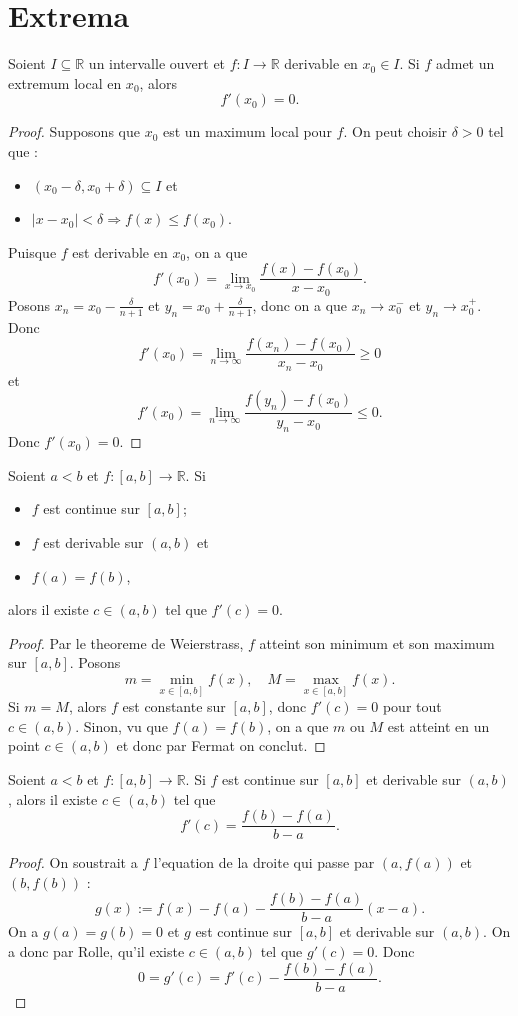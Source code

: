 \section{Extrema}
\begin{theorem}[Fermat]
Soient $I\subseteq \mathbb{R}$ un intervalle ouvert et $f:I\to \mathbb{R}$ derivable en $x_{0}\in I$. Si $f$ admet un extremum local en $x_{0}$, alors
$$
f'(x_{0})=0.
$$
\end{theorem}
\begin{proof}
Supposons que $x_{0}$ est un maximum local pour $f$. On peut choisir $\delta>0$ tel que :
\begin{itemize}
\item $(x_{0}-\delta,x_{0}+\delta)\subseteq I$ et
\item $|x-x_{0}|<\delta \Rightarrow f(x)\le f(x_{0})$.
\end{itemize}
Puisque $f$ est derivable en $x_{0}$, on a que
$$
f'(x_{0})=\lim_{ x \to x_{0} } \frac{f(x)-f(x_{0})}{x-x_{0}}.
$$
Posons $x_{n}=x_{0}-\frac{\delta}{n+1}$ et $y_{n}=x_{0}+\frac{\delta}{n+1}$, donc on a que $x_{n}\to x_{0}^{-}$ et $y_{n}\to x_{0}^{+}$. Donc
$$
f'(x_{0})=\lim_{ n\to \infty}  \frac{f(x_{n})-f(x_{0})}{x_{n}-x_{0}} \ge0
$$
et
$$
f'(x_{0})=\lim_{ n \to \infty } \frac{f(y_{n})-f(x_{0})}{y_{n}-x_{0}} \le 0.
$$
Donc $f'(x_{0})=0$.
\end{proof}
\begin{theorem}[Rolle]
Soient $a<b$ et $f:[a,b]\to \mathbb{R}$. Si
\begin{itemize}
\item $f$ est continue sur $[a,b]$;
\item $f$ est derivable sur $(a,b)$ et
\item $f(a)=f(b)$,
\end{itemize}
alors il existe $c\in(a,b)$ tel que $f'(c)=0$.
\end{theorem}
\begin{proof}
Par le theoreme de Weierstrass, $f$ atteint son minimum et son maximum sur $[a,b]$. Posons
$$
m=\min_{x \in [a,b]}f(x),\quad M=\max_{x \in [a,b]} f(x).
$$
Si $m=M$, alors $f$ est constante sur $[a,b]$, donc $f'(c)=0$ pour tout $c\in(a,b)$. Sinon, vu que $f(a)=f(b)$, on a que $m$ ou $M$ est atteint en un point $c\in(a,b)$ et donc par Fermat on conclut. 
\end{proof}
\begin{theorem}
Soient $a<b$ et $f:[a,b]\to \mathbb{R}$. Si $f$ est continue sur $[a,b]$ et derivable sur $(a,b)$, alors il existe $c\in(a,b)$ tel que
$$
f'(c)= \frac{f(b)-f(a)}{b - a}. 
$$
\end{theorem}
\begin{proof}
On soustrait a $f$ l'equation de la droite qui passe par $(a,f(a))$ et $(b,f(b))$ :
$$
g(x):= f(x)-f(a)-\frac{f(b)-f(a)}{b - a}(x-a).
$$
On a $g(a)=g(b)=0$ et $g$ est continue sur $[a,b]$ et derivable sur $(a,b)$. On a donc par Rolle, qu'il existe $c\in(a,b)$ tel que $g'(c)=0$. Donc
$$
0=g'(c)=f'(c)-\frac{f(b)-f(a)}{b - a}.
$$
\end{proof}


